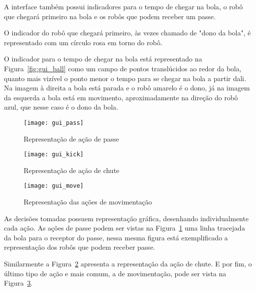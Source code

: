 A interface também possui indicadores para o tempo de chegar na bola, o robô que
chegará primeiro na bola e os robôs que podem receber um passe.

O indicador do robô que chegará primeiro, às vezes chamado de "dono da bola", é
representado com um círculo rosa em torno do robô.

O indicador para o tempo de chegar na bola está representado na
Figura~\ref{fig:gui_ball} como um campo de pontos translúcidos ao redor da bola,
quanto mais vizível o ponto menor o tempo para se chegar na bola a partir dali.
Na imagem à direita a bola está parada e o robô amarelo é o dono, já na imagem
da esquerda a bola está em movimento, aproximadamente na direção do robô azul,
que nesse caso é o dono da bola.


\begin{figure}[h]
  \centering
  \texttt{[image: gui\_pass]}
  \caption{Representação de ação de passe}\label{fig:gui_pass}
\end{figure}

\begin{figure}[h]
  \centering
  \texttt{[image: gui\_kick]}
  \caption{Representação de ação de chute}\label{fig:gui_kick}
\end{figure}

\begin{figure}[h]
  \centering
  \texttt{[image: gui\_move]}
  \caption{Representação das ações de movimentação}\label{fig:gui_move}
\end{figure}

As decisões tomadas possuem representação gráfica, desenhando individualmente
cada ação.  As ações de passe podem ser vistas na Figura~\ref{fig:gui_pass} uma
linha tracejada da bola para o receptor do passe, nessa mesma figura está
exemplificado a representação dos robôs que podem receber passe.

Similarmente a Figura~\ref{fig:gui_kick} apresenta a representação da ação de
chute.  E por fim, o último tipo de ação e mais comum, a de movimentação, pode
ser vista na Figura~\ref{fig:gui_move}.

\FloatBarrier

